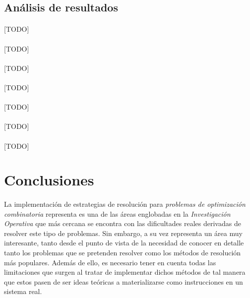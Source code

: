 \documentclass{subfiles}
\begin{document}
      \FloatBarrier
      \subsection{Análisis de resultados}
      \label{sec:results_analysis}

        \paragraph{}
        [TODO]

        \paragraph{}
        [TODO]

        \paragraph{}
        [TODO]

        \paragraph{}
        [TODO]

        \paragraph{}
        [TODO]

        \paragraph{}
        [TODO]

        \paragraph{}
        [TODO]

    \section{Conclusiones}
    \label{sec:implementation_results_conclusions}

      \paragraph{}
      La implementación de estrategias de resolución para \emph{problemas de optimización combinatoria} representa es una de las áreas englobadas en la \emph{Investigación Operativa} que más cercana se encontra con las dificultades reales derivadas de resolver este tipo de problemas. Sin embargo, a su vez representa un área muy interesante, tanto desde el punto de vista de la necesidad de conocer en detalle tanto los problemas que se pretenden resolver como los métodos de resolución más populares. Además de ello, es necesario tener en cuenta todas las limitaciones que surgen al tratar de implementar dichos métodos de tal manera que estos pasen de ser ideas teóricas a materializarse como instrucciones en un sistema real.
\end{document}
